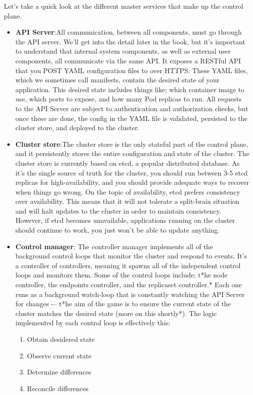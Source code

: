 \documentclass[10pt,a4paper]{report}
\begin{document}
Let’s take a quick look at the different master services that make up the control plane.
\begin{itemize}
	\item \textbf{API Server}:All communication, between all components, must go through the API server. We’ll get into the detail later in the book, but it’s important to understand that internal
	system components, as well as external user components, all communicate via the same API.
	It exposes a RESTful API that you POST YAML configuration files to over HTTPS. These YAML files, which we sometimes call manifests, contain the desired state of your application. This desired state includes things like; which container image to use, which ports to expose, and how many Pod replicas to run.
	All requests to the API Server are subject to authentication and authorization checks, but once these are done, the config in the YAML file is validated, persisted to the cluster store, and deployed to the cluster.
	
	\item \textbf{Cluster store}:The cluster store is the only stateful part of the control plane, and it persistently stores the entire configuration and state of the cluster. The cluster store is currently based on etcd, a popular distributed database. As it’s the single source of truth for the cluster, you should run between 3-5 etcd replicas for high-availability, and you should provide adequate ways to recover when things go wrong.
	On the topic of availability, etcd prefers consistency over availability. This means that it will not tolerate a split-brain situation and will halt updates to the cluster in order to maintain consistency. However, if etcd becomes unavailable, applications running on the cluster should continue to work, you just won’t be able to
	update anything.
	
	\item \textbf{Control manager}:
	The controller manager implements all of the background control loops that monitor the cluster and respond to events. It’s a controller of controllers, meaning it spawns all of the independent control loops and monitors them. Some of the control loops include; t*he node controller, the endpoints controller, and the replicaset controller.* Each one runs as a background watch-loop that is constantly watching the API Server for changes -– t*he aim of the game is to ensure the current state of the cluster matches the desired state (more on this shortly*).
	The logic implemented by each control loop is effectively this:
	\begin{enumerate}
		\item  Obtain desidered state
		\item Observe current state
		\item Determine differences
		\item Reconcile differences
		

\end{enumerate}
\end{itemize}
\end{document}
